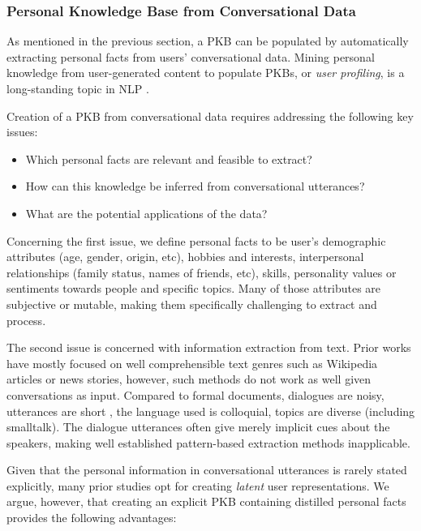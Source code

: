 \subsubsection{Personal Knowledge Base from Conversational Data}

As mentioned in the previous section, a PKB can be populated by automatically extracting personal facts from users' conversational data. Mining personal knowledge from user-generated content to populate PKBs, or \emph{user profiling}, is a long-standing topic in NLP \cite{flekova:ACL16:long,basile:2017}.

Creation of a PKB from conversational data requires addressing the following key issues:

\begin{itemize}
    \item Which personal facts are relevant and feasible to extract?
    \item How can this knowledge be inferred from conversational utterances?
    \item What are the potential applications of the data?
\end{itemize}

Concerning the first issue, we define personal facts to be user's demographic attributes (age, gender, origin, etc), hobbies and interests, interpersonal relationships (family status, names of friends, etc), skills, personality values or sentiments towards people and specific topics. Many of those attributes are subjective or mutable, making them specifically challenging to extract and process.

The second issue is concerned with information extraction from text. Prior works have mostly focused on well comprehensible text genres
such as Wikipedia articles or news stories, however, such methods do not work as well given conversations as input.
Compared to formal documents, dialogues are noisy, utterances are short \cite{bontcheva2014making}, the language used is
colloquial, topics are diverse (including smalltalk). The dialogue utterances often give merely implicit cues about the speakers, making well established pattern-based extraction methods inapplicable.

Given that the personal information in conversational utterances is rarely stated explicitly, many prior studies opt for creating \textit{latent} user representations. We argue, however, that creating an explicit PKB containing distilled personal facts provides the following advantages:

